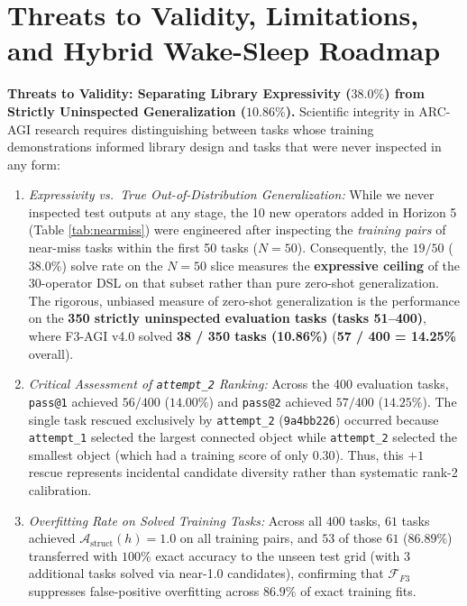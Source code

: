 \documentclass[10pt,a4paper]{article}
\begin{document}
\section{Threats to Validity, Limitations, and Hybrid Wake-Sleep Roadmap}

\textbf{Threats to Validity: Separating Library Expressivity ($38.0\%$) from Strictly Uninspected Generalization ($10.86\%$).}
Scientific integrity in ARC-AGI research requires distinguishing between tasks whose training demonstrations informed library design and tasks that were never inspected in any form:
\begin{enumerate}
    \item \emph{Expressivity vs.\ True Out-of-Distribution Generalization:} While we never inspected test outputs at any stage, the 10 new operators added in Horizon 5 (Table \ref{tab:nearmiss}) were engineered after inspecting the \emph{training pairs} of near-miss tasks within the first 50 tasks ($N=50$). Consequently, the $19/50$ ($38.0\%$) solve rate on the $N=50$ slice measures the \textbf{expressive ceiling} of the 30-operator DSL on that subset rather than pure zero-shot generalization. The rigorous, unbiased measure of zero-shot generalization is the performance on the \textbf{350 strictly uninspected evaluation tasks (tasks 51--400)}, where F3-AGI v4.0 solved \textbf{38 / 350 tasks (10.86\%)} (\textbf{57 / 400 = 14.25\%} overall).
    \item \emph{Critical Assessment of \texttt{attempt\_2} Ranking:} Across the 400 evaluation tasks, \texttt{pass@1} achieved $56/400$ ($14.00\%$) and \texttt{pass@2} achieved $57/400$ ($14.25\%$). The single task rescued exclusively by \texttt{attempt\_2} (\texttt{9a4bb226}) occurred because \texttt{attempt\_1} selected the largest connected object while \texttt{attempt\_2} selected the smallest object (which had a training score of only $0.30$). Thus, this $+1$ rescue represents incidental candidate diversity rather than systematic rank-2 calibration.
    \item \emph{Overfitting Rate on Solved Training Tasks:} Across all $400$ tasks, $61$ tasks achieved $\mathcal{A}_{\text{struct}}(h) = 1.0$ on all training pairs, and $53$ of those $61$ ($86.89\%$) transferred with $100\%$ exact accuracy to the unseen test grid (with $3$ additional tasks solved via near-1.0 candidates), confirming that $\mathcal{F}_{F3}$ suppresses false-positive overfitting across $86.9\%$ of exact training fits.

\end{enumerate}
\end{document}

